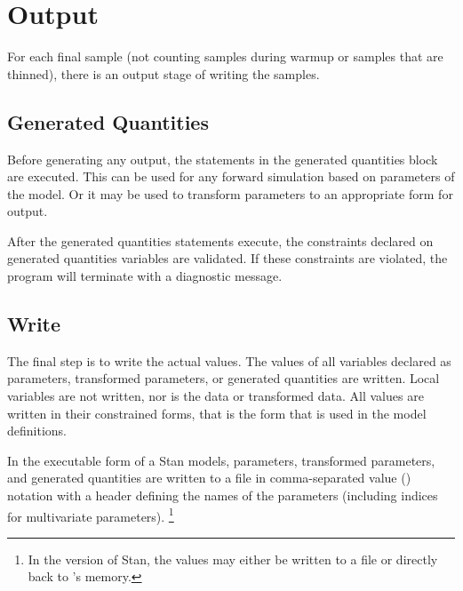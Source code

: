 \section{Output}

For each final sample (not counting samples during warmup or samples
that are thinned), there is an output stage of writing the samples.

\subsection{Generated Quantities}

Before generating any output, the statements in the generated quantities
block are executed.  This can be used for any forward simulation based
on parameters of the model.  Or it may be used to transform parameters
to an appropriate form for output.

After the generated quantities statements execute, the constraints
declared on generated quantities variables are validated.   If these
constraints are violated, the program will terminate with a diagnostic message.

\subsection{Write}

The final step is to write the actual values.  The values of all
variables declared as parameters, transformed parameters, or generated
quantities are written.  Local variables are not written, nor is the
data or transformed data.  All values are written in their constrained
forms, that is the form that is used in the model definitions.

In the executable form of a Stan models, parameters, transformed
parameters, and generated quantities are written to a file in
comma-separated value () notation with a header defining
the names of the parameters (including indices for multivariate
parameters).%
\footnote{In the \R version of Stan, the values may either be
written to a  file or directly back to \R's memory.}




